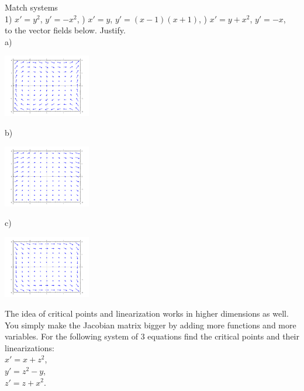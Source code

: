 \documentclass[12pt]{book}
\begin{document}
\begin{exercise}
Match systems\\
1) $x'=y^2$, $y'=-x^2$,
) $x'=y$, $y'=(x-1)(x+1)$,
) $x'=y+x^2$, $y'=-x$,
\\
to the vector fields below.  Justify.
\\
a)
\parbox[c]{1.6in}{\includegraphics[width=1.5in]{figures/nlin-exer-y-xm1xp1}}
b)
\parbox[c]{1.6in}{\includegraphics[width=1.5in]{figures/nlin-exer-ypx2-mx}}
c)
\parbox[c]{1.6in}{\includegraphics[width=1.5in]{figures/nlin-exer-y2-mx2}}
\end{exercise}


\begin{exercise}
The idea of critical points and linearization works in higher dimensions as
well.  You simply make the Jacobian matrix bigger by adding more functions
and more variables.  For the following system
of 3 equations find the critical points and their linearizations:\\
$x' = x + z^2$,\\$y' = z^2-y$,\\$z' = z+x^2$.
\end{exercise}
\end{document}

